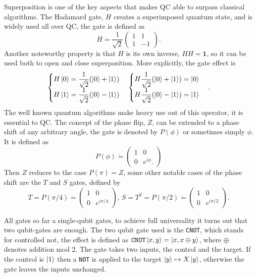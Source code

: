 Superposition is one of the key aspects that makes QC able to surpass classical algorithms. The Hadamard gate, $H$ creates a superimposed quantum state, and is widely used all over QC, the gate is defined as
\begin{equation}
H \dot{=} \dfrac{1}{\sqrt{2}}\begin{pmatrix}
1 & 1 \\ 1 & -1
\end{pmatrix}.
\end{equation}
Another noteworthy property is that $H$ is its own inverse, $HH = \mathbf{1}$, so it can be used both to open and close superposition. More explicitly, the gate effect is 
\begin{equation}
\begin{cases}
H\ket{0} = \dfrac{1}{\sqrt{2}}(\ket{0} + \ket{1})
\\
H\ket{1} = \dfrac{1}{\sqrt{2}}(\ket{0} - \ket{1})
\end{cases}
\begin{cases}
H\dfrac{1}{\sqrt{2}}(\ket{0} + \ket{1}) = \ket{0}
\\
H\dfrac{1}{\sqrt{2}}(\ket{0} - \ket{1}) = \ket{1}
\end{cases}.
\end{equation}
The well known quantum algorithms make heavy use out of this operator\cite{Grover}\cite{shor}, it is essential to QC.
The concept of the phase flip, $Z$, can be extended to a phase shift of any arbitrary angle, the gate is denoted by $P(\phi)$ or sometimes simply $\phi$. It is defined as 
\begin{equation}
P(\phi) \dot{=} \begin{pmatrix}
1 & 0 \\
0 & e^{i\phi}.
\end{pmatrix}
\end{equation}
Then $Z$ reduces to the case $P(\pi) = Z$, some other notable cases of the phase shift are the $T$ and $S$ gates, defined by
\begin{equation}
T = P({\pi/4}) \dot{=} \begin{pmatrix}
1 & 0 \\ 0 & e^{i\pi/4}
\end{pmatrix},\, S = T^2 = P({\pi/2}) \dot{=} \begin{pmatrix}
1 & 0 \\ 0 & e^{i\pi/2}
\end{pmatrix}.
\end{equation}

All gates so far a single-qubit gates, to achieve full universality it turns out that two qubit-gates are enough. The two qubit gate used is the {\tt CNOT}, which stands for controlled not, the effect is defined as ${\tt CNOT}\ket{x,y} = \ket{x,x\oplus y}$, where $\oplus$ denotes addition mod 2. The gate takes two inputs, the control and the target. If the control is $\ket{1}$ then a {\tt NOT} is applied to the target $\ket{y} \mapsto X\ket{y}$, otherwise the gate leaves the inputs unchanged.



